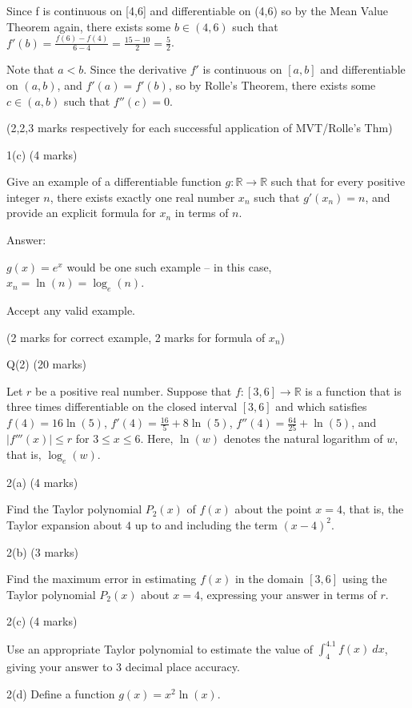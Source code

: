 \documentclass[a4paper,12pt,oneside]{book}
\theoremstyle{definition}
\begin{document}
Since f is continuous on [4,6] and differentiable on (4,6) so by the Mean Value Theorem again, there exists some $b \in (4,6)$ such that $f'(b) = \frac{f(6)-f(4)}{6-4} = \frac{15-10}{2} = \frac{5}{2}$. 

Note that $a<b$. Since the derivative $f'$ is continuous on $[a,b]$ and differentiable on $(a,b)$, and $f'(a)=f'(b)$, so by Rolle's Theorem, there exists some $c \in (a,b)$ such that $f''(c) = 0$.

(2,2,3 marks respectively for each successful application of MVT/Rolle's Thm)

1(c) (4 marks)

Give an example of a differentiable function $g : \mathbb{R} \rightarrow \mathbb{R}$ such that for every positive integer $n$, there exists exactly one real number $x_n$ such that $g'(x_n)=n$, and provide an explicit formula for $x_n$ in terms of $n$.

Answer:

$g(x) = e^x$ would be one such example -- in this case, $x_n = \ln(n) = \log_e(n)$.

Accept any valid example.

(2 marks for correct example, 2 marks for formula of $x_n$)

\newpage

Q(2) (20 marks)

Let $r$ be a positive real number. Suppose that $f : [3,6] \rightarrow \mathbb{R}$ is a function that is three times differentiable on the closed interval $[3,6]$ and which satisfies $f(4) = 16 \ln(5)$, $f'(4) = \frac{16}{5} + 8 \ln(5)$, $f''(4) = \frac{64}{25} + \ln(5)$, and $|f'''(x)| \leq r$ for $3 \leq x \leq 6$. Here, $\ln(w)$ denotes the natural logarithm of $w$, that is, $\log_e(w)$.

2(a) (4 marks)

Find the Taylor polynomial $P_2(x)$ of $f(x)$ about the point $x=4$, that is, the Taylor expansion about $4$ up to and including the term $(x-4)^2$.

2(b) (3 marks)

Find the maximum error in estimating $f(x)$ in the domain $[3,6]$ using the Taylor polynomial $P_2(x)$ about $x=4$, expressing your answer in terms of $r$.

2(c) (4 marks)

Use an appropriate Taylor polynomial to estimate the value of $\int_4^{4.1} f(x) \ dx$, giving your answer to 3 decimal place accuracy.

2(d) Define a function $g(x) = x^2 \ln(x)$.
\end{document}
